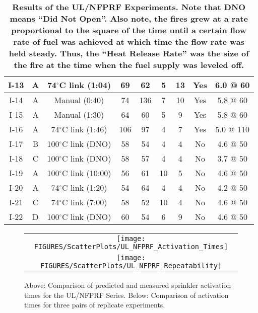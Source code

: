 \begin{table}[h]
\begin{center}
\begin{tabular}{|c||c|c|c|c|c|c|c|c|}
I-13  & A  & 74$^\circ$C link (1:04)    & 69   & 62                             & 5    & 13     & Yes  & 6.0 @ 60  \\ \hline
I-14  & A  & Manual (0:40)              & 74   & 136                            & 7    & 10     & Yes  & 5.8 @ 60  \\ \hline
I-15  & A  & Manual (1:30)              & 64   & 60                             & 5    & 9      & Yes  & 5.8 @ 60  \\ \hline
I-16  & A  & 74$^\circ$C link (1:46)    & 106  & 97                             & 4    & 7      & Yes  & 5.0 @ 110 \\ \hline
\hline
I-17  & B  & 100$^\circ$C link (DNO)    & 58   & 54                             & 4    & 4      & No   & 4.6 @ 50 \\ \hline
I-18  & C  & 100$^\circ$C link (DNO)    & 58   & 57                             & 4    & 4      & No   & 3.7 @ 50 \\ \hline
I-19  & A  & 100$^\circ$C link (10:00)  & 56   & 61                             & 10   & 5      & No   & 4.6 @ 50 \\ \hline
I-20  & A  & 74$^\circ$C link (1:20)    & 54   & 64                             & 4    & 4      & No   & 4.2 @ 50 \\ \hline
I-21  & C  & 74$^\circ$C link (7:00)    & 58   & 52                             & 10   & 4      & No   & 4.6 @ 50 \\ \hline
I-22  & D  & 100$^\circ$C link (DNO)    & 60   & 54                             & 6    & 9      & No   & 4.6 @ 50 \\ \hline
\end{tabular}
\end{center}
\caption[Results of the UL/NFPRF Experiments.]
{\bf Results of the UL/NFPRF Experiments. Note that DNO means
``Did Not Open''. Also note, the fires grew at a rate proportional
to the square of the time until a certain flow rate of fuel was achieved
at which time the flow rate was held steady. Thus, the ``Heat Release Rate''
was the size of the fire at the time when the fuel supply was leveled off.}
\label{ULmatrix}
\end{table}

\begin{figure}[p]
\begin{center}
\begin{tabular}{c}
\texttt{[image: FIGURES/ScatterPlots/UL\_NFPRF\_Activation\_Times]} \\
\texttt{[image: FIGURES/ScatterPlots/UL\_NFPRF\_Repeatability]}
\vspace{0.25in}
\end{tabular}
\caption{Above: Comparison of predicted and measured sprinkler activation times for the UL/NFPRF Series. Below: Comparison of activation
times for three pairs of replicate experiments.}
\end{center}
\end{figure}


